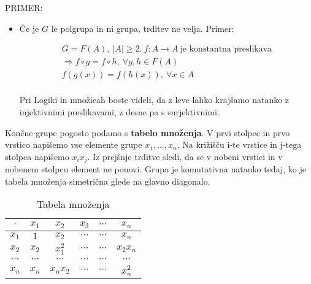 \documentclass[a4paper,12pt]{article}
\begin{document}
\newpage 

\noindent PRIMER:
\begin{itemize}
\item Če je $G$ le polgrupa in ni grupa, trditev ne velja. Primer: 

\begin{gather*}
G=F(A),~|A| \geq 2. ~ f: A \rightarrow A~ \text{je konstantna preslikava} \\
\Rightarrow f \circ g = f \circ h,~\forall g,h \in F(A) \\
f(g(x))=f(h(x)),~\forall x \in A\\
\end{gather*}

Pri Logiki in množicah boste videli, da z leve lahko krajšamo natanko z injektivnimi preslikavami, z desne pa s surjektivnimi.\\
\end{itemize}

\noindent Končne grupe pogosto podamo s \textbf{tabelo množenja}. V prvi stolpec in prvo vrstico napišemo vse elemente grupe $x_1,\ldots,x_n$. Na križišču i-te vrstice in j-tega stolpca napišemo $x_i x_j$. Iz prejšnje trditve sledi, da se v nobeni vrstici in v nobenem stolpcu element ne ponovi. Grupa je komutativna natanko tedaj, ko je tabela množenja simetrična glede na glavno diagonalo.

\begin{table}[hbp]
\centering
\label{tab:tmn}
\caption{Tabela množenja}
\begin{tabular}{c|ccccc}
$\cdot$ & $x_1$ & $x_2$ & $x_3$ & $\cdots$ & $x_n$ \\
\hline
$x_1$ & $1$ & $x_2$ & $\cdots$ & $\cdots$ & $x_n$ \\
$x_2$ & $x_2$ & $x_1^2$ & $\cdots$ & $\cdots$ & $x_2 x_n$ \\
$\cdots$ & $\cdots$ & $\cdots$ & $\cdots$ & $\cdots$ & $\cdots$ \\
$x_n$ & $x_n$ & $x_n x_2$ & $\cdots$ & $\cdots$ & $x_n^2$ \\
\end{tabular}
\end{table} 

\newpage 
\end{document}
